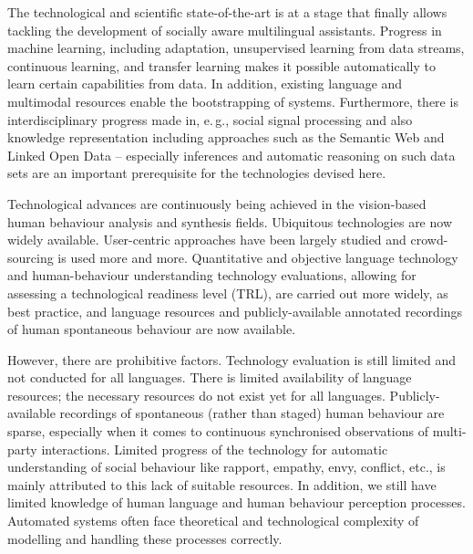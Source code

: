 \documentclass[10pt, plain]{../../metanetpaper}
\begin{document}
\begin{multicols}{2}
The technological and scientific state-of-the-art is at a stage that finally allows tackling the development of socially aware multilingual assistants. Progress in machine learning, including adaptation, unsupervised learning from data streams, continuous learning, and transfer learning makes it possible automatically to learn certain capabilities from data. In addition, existing language and multimodal resources enable the bootstrapping of systems. Furthermore, there is interdisciplinary progress made in, e.\,g., social signal processing and also knowledge representation including approaches such as the Semantic Web and Linked Open Data -- especially inferences and automatic reasoning on such data sets are an important prerequisite for the technologies devised here.
 
Technological advances are continuously being achieved in the vision-based human behaviour analysis and synthesis fields. Ubiquitous technologies are now widely available. User-centric approaches have been largely studied and crowd-sourcing is used more and more. Quantitative and objective language technology and human-behaviour understanding technology evaluations, allowing for assessing a technological readiness level (TRL), are carried out more widely, as best practice, and language resources and publicly-available annotated recordings of human spontaneous behaviour are now available.
 
However, there are prohibitive factors. Technology evaluation is still limited and not conducted for all languages. There is limited availability of language resources; the necessary resources do not exist yet for all languages. Publicly-available recordings of spontaneous (rather than staged) human behaviour are sparse, especially when it comes to continuous synchronised observations of multi-party interactions. Limited progress of the technology for automatic understanding of social behaviour like rapport, empathy, envy, conflict, etc., is mainly attributed to this lack of suitable resources. In addition, we still have limited knowledge of human language and human behaviour perception processes. Automated systems often face theoretical and technological complexity of modelling and handling these processes correctly.


\end{multicols}
\end{document}
